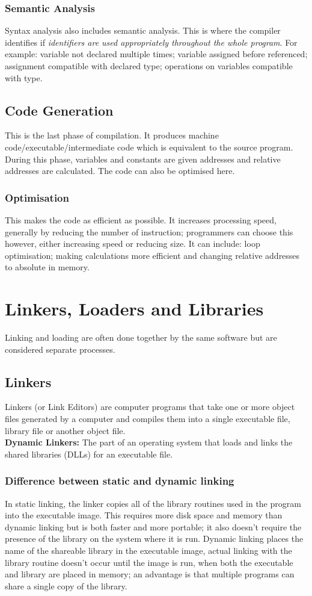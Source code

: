 \documentclass[a4paper,11pt, twocolumn]{article}
\begin{document}
\subsubsection{Semantic Analysis}
Syntax analysis also includes semantic analysis. This is where the compiler identifies if \textit{identifiers are used appropriately throughout the whole program}. For example: variable not declared multiple times; variable assigned before referenced; assignment compatible with declared type; operations on variables compatible with type.
\subsection{Code Generation}
This is the last phase of compilation. It produces machine code/executable/intermediate code which is equivalent to the source program. During this phase, variables and constants are given addresses and relative addresses are calculated. The code can also be optimised here.
\subsubsection{Optimisation}
This makes the code as efficient as possible. It increases processing speed, generally by reducing the number of instruction; programmers can choose this however, either increasing speed or reducing size. It can include: loop optimisation; making calculations more efficient and changing relative addresses to absolute in memory. 

\section{Linkers, Loaders and Libraries}
Linking and loading are often done together by the same software but are considered separate processes. 
\subsection{Linkers}
Linkers (or Link Editors) are computer programs that take one or more object files generated by a computer and compiles them into a single executable file, library file or another object file.\\
\textbf{Dynamic Linkers:} The part of an operating system that loads and links the shared libraries (DLLs) for an executable file.
\subsubsection{Difference between static and dynamic linking}
In static linking, the linker copies all of the library routines used in the program into the executable image. This requires more disk space and memory than dynamic linking but is both faster and more portable; it also doesn't require the presence of the library on the system where it is run. Dynamic linking places the name of the shareable library in the executable image, actual linking with the library routine doesn't occur until the image is run, when both the executable and library are placed in memory; an advantage is that multiple programs can share a single copy of the library. 
\end{document}
